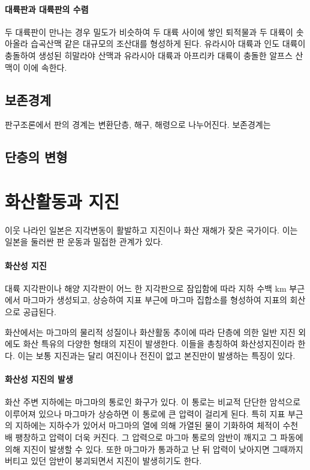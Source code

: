 \documentclass[12pt, a4paper, oneside]{book}
\begin{document}
	
		\paragraph{대륙판과 대륙판의 수렴}
		두 대륙판이 만나는 경우 밀도가 비슷하여 두 대륙 사이에 쌓인 퇴적물과 두 대륙이 솟아올라 습곡산맥 같은 대규모의 조산대를 형성하게 된다.
		유라시아 대륙과 인도 대륙이 충돌하여 생성된 히말라야 산맥과 유라시아 대륙과 아프리카 대륙이 충돌한 알프스 산맥이 이에 속한다.
		
		
	
	\subsection{보존경계}
		판구조론에서 판의 경계는 변환단층, 해구, 해령으로 나누어진다.
		보존경계는 
	

	\subsection{단층의 변형}
	
	
	
	
	\clearpage
	\section{화산활동과 지진}

	이웃 나라인 일본은 지각변동이 활발하고 지진이나 화산 재해가 잦은 국가이다.
	이는 일본을 둘러싼 판 운동과 밀접한 관계가 있다.
	
	\paragraph{화산성 지진}

	대륙 지각판이나 해양 지각판이 어느 한 지각판으로 잠입함에 따라 
	지하 수백 km 부근에서 마그마가 생성되고, 상승하여 
	지표 부근에 마그마 집합소를 형성하여 지표의 회산으로 공급된다.
	
	
	화산에서는 마그마의 물리적 성질이나 화산활동 추이에 따라 단층에 의한 일반 지진 외에도 
	화산 특유의 다양한 형태의 지진이 발생한다. 이들을 총칭하여 화산성지진이라 한다.
	이는 보통 지진과는 달리 여진이나 전진이 없고 본진만이 발생하는 특징이 있다.
	
	\paragraph{화산성 지진의 발생}
	화산 주변 지하에는 마그마의 통로인 화구가 있다. 
	이 통로는 비교적 단단한 암석으로 이루어져 있으나 마그마가 상승하면 이 통로에 큰 압력이 걸리게 된다. 
	특히 지표 부근의 지하에는 지하수가 있어서 마그마의 열에 의해 가열된 물이 기화하여 체적이 수천 배 팽창하고 압력이 더욱 커진다. 
	그 압력으로 마그마 통로의 암반이 깨지고 그 파동에 의해 지진이 발생할 수 있다. 
	또한 마그마가 통과하고 난 뒤 압력이 낮아지면 그때까지 버티고 있던 암반이 붕괴되면서 지진이 발생히기도 한다.
	
\end{document}
